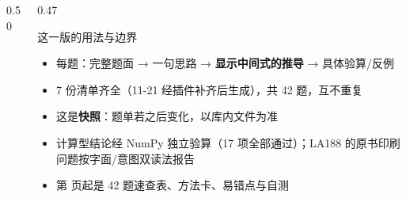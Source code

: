 \documentclass[aspectratio=169,10pt,fontset=none]{ctexbeamer}
\begin{document}
\begin{frame}[plain]
\begin{columns}[T,onlytextwidth]
\begin{column}{0.50\textwidth}
    \end{column}
    \begin{column}{0.47\textwidth}
      \begin{block}{这一版的用法与边界}
        \scriptsize
        \begin{itemize}\setlength{\itemsep}{1pt}
          \item 每题：完整题面 → 一句思路 → \textbf{显示中间式的推导} → 具体验算/反例
          \item 7 份清单齐全（11-21 经插件补齐后生成），共 42 题，互不重复
          \item 这是\textbf{快照}：题单若之后变化，以库内文件为准
          \item 计算型结论经 NumPy 独立验算（17 项全部通过）；LA188 的原书印刷问题按字面/意图双读法报告
          \item 第 \pageref{sec:answers} 页起是 42 题速查表、方法卡、易错点与自测
        \end{itemize}
      \end{block}
    \end{column}
  \end{columns}
\end{frame}
\end{document}
